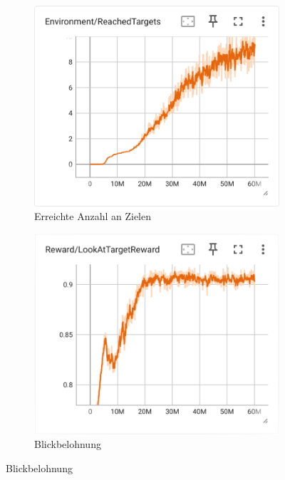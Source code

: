 \begin{figure}[H]
\begin{subfigure}{.49\textwidth}
    \end{subfigure}
    \begin{subfigure}{.49\textwidth}
      \centering  
      \includegraphics[width=\textwidth]{img/106_reach_target}
      \caption{Erreichte Anzahl an Zielen}
      \label{fig:106_reach_target}
    \end{subfigure}
    \begin{subfigure}{.49\textwidth}
      \centering  
      \includegraphics[width=\textwidth]{img/106_look_reward}
      \caption{Blickbelohnung}
      \label{fig:106_look_reward}

\end{subfigure}
\end{figure}
